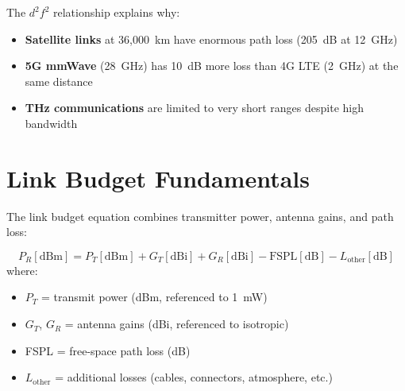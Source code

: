 \begin{center}
\end{center}

\begin{keyconcept}
The $d^2 f^2$ relationship explains why:
\begin{itemize}
\item \textbf{Satellite links} at 36,000~km have enormous path loss (205~dB at 12~GHz)
\item \textbf{5G mmWave} (28~GHz) has 10~dB more loss than 4G LTE (2~GHz) at the same distance
\item \textbf{THz communications} are limited to very short ranges despite high bandwidth
\end{itemize}
\end{keyconcept}

\section{Link Budget Fundamentals}

The link budget equation combines transmitter power, antenna gains, and path loss:

\begin{equation}
P_R[\text{dBm}] = P_T[\text{dBm}] + G_T[\text{dBi}] + G_R[\text{dBi}] - \text{FSPL}[\text{dB}] - L_{\text{other}}[\text{dB}]
\end{equation}
where:
\begin{itemize}
\item $P_T$ = transmit power (dBm, referenced to 1~mW)
\item $G_T$, $G_R$ = antenna gains (dBi, referenced to isotropic)
\item FSPL = free-space path loss (dB)
\item $L_{\text{other}}$ = additional losses (cables, connectors, atmosphere, etc.)
\end{itemize}


